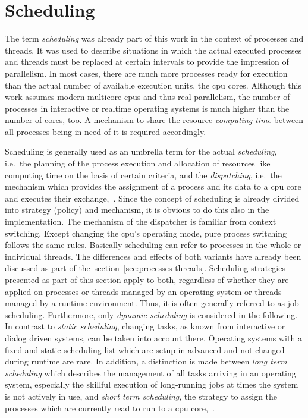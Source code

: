 %

\section{Scheduling}\label{sec:scheduling}
The term \textit{scheduling} was already part of this work in the context of processes and threads.
It was used to describe situations in which the actual executed processes and threads must be replaced at certain intervals to provide the impression of parallelism.
In most cases, there are much more processes ready for execution than the actual number of available execution units, the \ac{cpu} cores.
Although this work assumes modern multicore \acp{cpu} and thus real parallelism, the number of processes in interactive or realtime operating systems is much higher than the number of cores, too.
A mechanism to share the resource \textit{computing time} between all processes being in need of it is required accordingly.

Scheduling is generally used as an umbrella term for the actual \textit{scheduling}, i.e.\ the planning of the process execution and allocation of resources like computing time on the basis of certain criteria, and the \textit{dispatching}, i.e.\ the mechanism which provides the assignment of a process and its data to a \ac{cpu} core and executes their exchange\cite{brause2017betriebssysteme},~\cite{mandl2014Grundkurs}.
Since the concept of scheduling is already divided into strategy (policy) and mechanism, it is obvious to do this also in the implementation.
The mechanism of the dispatcher is familiar from context switching.
Except changing the \ac{cpu}'s operating mode, pure process switching follows the same rules.
Basically scheduling can refer to processes in the whole or individual threads\cite{mandl2014Grundkurs}.
The differences and effects of both variants have already been discussed as part of the~section~\ref{sec:processes-threads}.
Scheduling strategies presented as part of this section apply to both, regardless of whether they are applied on processes or threads managed by an operating system or threads managed by a runtime environment.
Thus, it is often generally referred to as job scheduling\cite{mandl2014Grundkurs}.
Furthermore, only \textit{dynamic scheduling} is considered in the following.
In contrast to \textit{static scheduling}, changing tasks, as known from interactive or dialog driven systems, can be taken into account there.
Operating systems with a fixed and static scheduling list which are setup in advanced and not changed during runtime are rare\cite{brause2017betriebssysteme}.
In addition, a distinction is made between \textit{long term scheduling} which describes the management of all tasks arriving in an operating system, especially the skillful execution of long-running jobs at times the system is not actively in use, and \textit{short term scheduling}, the strategy to assign the processes which are currently read to run to a \ac{cpu} core\cite{brause2017betriebssysteme},~\cite{mandl2014Grundkurs}.

